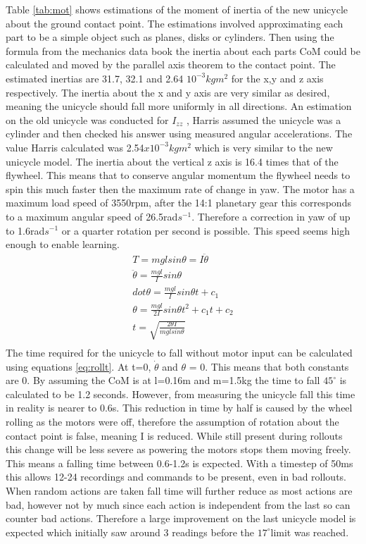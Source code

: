 \documentclass[twoside,twocolumn,12pt]{article}
\begin{document}
Table \ref{tab:mot} shows estimations of the moment of inertia of the new unicycle about the ground contact point. The estimations involved approximating each part to be a simple object such as planes, disks or cylinders. Then using the formula from the mechanics data book the inertia about each parts CoM could be calculated and moved by the parallel axis theorem to the contact point. The estimated inertias are 31.7, 32.1 and 2.64 $10^{-3}kgm^2$  for the x,y and z axis respectively. The inertia about the x and y axis are very similar as desired, meaning the unicycle should fall more uniformly in all directions. An estimation on the old unicycle was conducted for $I_{zz}$ \cite{arselan}, Harris assumed the unicycle was a cylinder and then checked his answer using measured angular accelerations. The value Harris calculated was 2.54$x10^{-3}kgm^2$ which is very similar to the new unicycle model.
\newline
The inertia about the vertical z axis is 16.4 times that of the flywheel. This means that to conserve angular momentum the flywheel needs to spin this much faster then the maximum rate of change in yaw. The motor has a maximum load speed of 3550rpm, after the 14:1 planetary gear this corresponds to a maximum angular speed of 26.5rad$s^{-1}$. Therefore a correction in yaw of up to 1.6rad$s^{-1}$ or a quarter rotation per second is possible. This speed seems high enough to enable learning.
\begin{equation}
\begin{split}
T = mgl sin\theta = I\ddot{\theta} \\
\ddot{\theta} = \frac{mgl}{I}sin\theta\\
dot{\theta} = \frac{mgl}{I}sin\theta t + c_1\\
\theta = \frac{mgl}{2I}sin\theta t^2 + c_1t + c_2\\
t = \sqrt{\frac{2\theta I}{mglsin\theta}} \\
\end{split}
\label{eq:rollt}
\end{equation}
The time required for the unicycle to fall without motor input can be calculated using equations \ref{eq:rollt}. At t=0, $\dot{\theta}$ and $\theta$ = 0. This means that both constants are 0. By assuming the CoM is at l=0.16m and m=1.5kg the time to fall $45^{\circ}$ is calculated to be 1.2 seconds. However, from measuring the unicycle fall this time in reality is nearer to 0.6s. This reduction in time by half is caused by the wheel rolling as the motors were off, therefore the assumption of rotation about the contact point is false, meaning I is reduced. While still present during rollouts this change will be less severe as powering the motors stops them moving freely. This means a falling time between 0.6-1.2s is expected. With a timestep of 50ms this allows 12-24 recordings and commands to be present, even in bad rollouts. When random actions are taken fall time will further reduce as most actions are bad, however not by much since each action is independent from the last so can counter bad actions. Therefore a large improvement on the last unicycle model is expected which initially saw around 3 readings before the $17^{\circ}$limit was reached.
\end{document}
